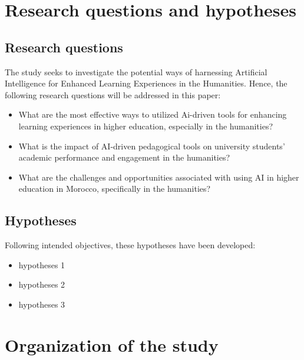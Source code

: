 \section{Research questions and hypotheses}
\subsection{Research questions}
\justifying
The study seeks to investigate the potential ways
of harnessing Artificial Intelligence for
Enhanced Learning Experiences in the Humanities. Hence,
the following research questions will be addressed in this paper:
\begin{itemize}
    \item What are the most effective ways to utilized Ai-driven 
    tools for enhancing learning experiences in higher education, 
    especially in the humanities?
    \item What is the impact of AI-driven pedagogical tools 
    on university students' academic performance 
    and engagement in the humanities?
    \item What are the challenges and opportunities associated 
    with using AI in higher education in Morocco, 
    specifically in the humanities?
\end{itemize}
\subsection{Hypotheses}
\justifying
Following intended objectives, these hypotheses have been developed:
\begin{itemize}
    \item hypotheses 1
    \item hypotheses 2
    \item hypotheses 3
\end{itemize}


\section{Organization of the study}
\justifying
\lipsum[1]

